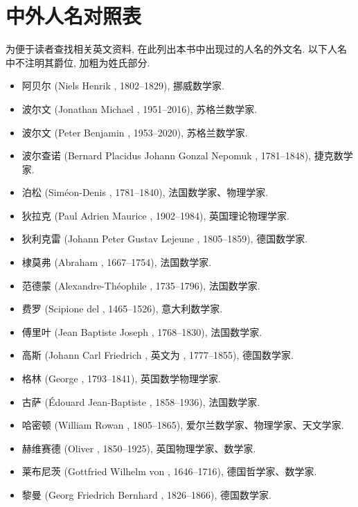 \chapter{中外人名对照表}

为便于读者查找相关英文资料, 在此列出本书中出现过的人名的外文名.
以下人名中不注明其爵位, 加粗为姓氏部分.

\begin{itemize}
  \item 阿贝尔 (Niels Henrik , 1802--1829), 挪威数学家.
  \item 波尔文 (Jonathan Michael , 1951--2016), 苏格兰数学家.
  \item 波尔文 (Peter Benjamin , 1953--2020), 苏格兰数学家.
  \item 波尔查诺 (Bernard Placidus Johann Gonzal Nepomuk , 1781--1848), 捷克数学家.
  \item 泊松 (Siméon-Denis , 1781--1840), 法国数学家、物理学家.
  \item 狄拉克 (Paul Adrien Maurice , 1902--1984), 英国理论物理学家.
  \item 狄利克雷 (Johann Peter Gustav Lejeune , 1805--1859), 德国数学家.
  \item 棣莫弗 (Abraham , 1667--1754), 法国数学家.
  \item 范德蒙 (Alexandre-Théophile , 1735--1796), 法国数学家.
  \item 费罗 (Scipione del , 1465--1526), 意大利数学家.
  \item 傅里叶 (Jean Baptiste Joseph , 1768--1830), 法国数学家.
  \item 高斯 (Johann Carl Friedrich , 英文为 , 1777--1855), 德国数学家.
  \item 格林 (George , 1793--1841), 英国数学物理学家.
  \item 古萨 (Édouard Jean-Baptiste , 1858--1936), 法国数学家.
  \item 哈密顿 (William Rowan , 1805--1865), 爱尔兰数学家、物理学家、天文学家.
  \item 赫维赛德 (Oliver , 1850--1925), 英国物理学家、数学家.
  \item 莱布尼茨 (Gottfried Wilhelm von , 1646--1716), 德国哲学家、数学家.
  \item 黎曼 (Georg Friedrich Bernhard , 1826--1866), 德国数学家.

\end{itemize}
